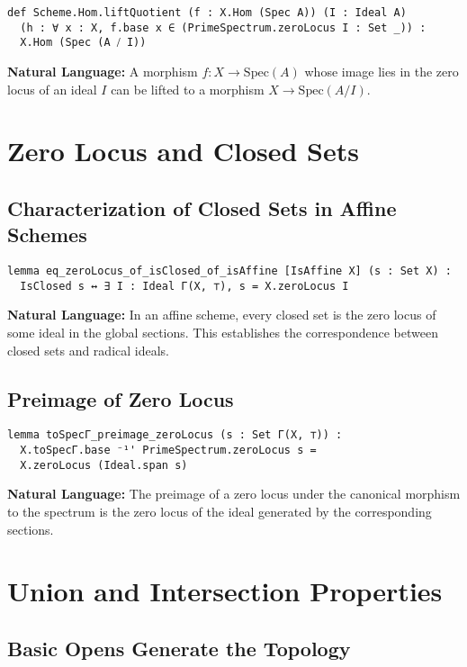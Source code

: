\documentclass{article}
\theoremstyle{definition}
\begin{document}
\begin{lstlisting}
def Scheme.Hom.liftQuotient (f : X.Hom (Spec A)) (I : Ideal A)
  (h : ∀ x : X, f.base x ∈ (PrimeSpectrum.zeroLocus I : Set _)) :
  X.Hom (Spec (A ⧸ I))
\end{lstlisting}

\textbf{Natural Language:} A morphism $f: X \to \mathrm{Spec}(A)$ whose image lies in the zero locus of an ideal $I$ can be lifted to a morphism $X \to \mathrm{Spec}(A/I)$.

\section{Zero Locus and Closed Sets}

\subsection{Characterization of Closed Sets in Affine Schemes}

\begin{lstlisting}
lemma eq_zeroLocus_of_isClosed_of_isAffine [IsAffine X] (s : Set X) :
  IsClosed s ↔ ∃ I : Ideal Γ(X, ⊤), s = X.zeroLocus I
\end{lstlisting}

\textbf{Natural Language:} In an affine scheme, every closed set is the zero locus of some ideal in the global sections. This establishes the correspondence between closed sets and radical ideals.

\subsection{Preimage of Zero Locus}

\begin{lstlisting}
lemma toSpecΓ_preimage_zeroLocus (s : Set Γ(X, ⊤)) :
  X.toSpecΓ.base ⁻¹' PrimeSpectrum.zeroLocus s =
  X.zeroLocus (Ideal.span s)
\end{lstlisting}

\textbf{Natural Language:} The preimage of a zero locus under the canonical morphism to the spectrum is the zero locus of the ideal generated by the corresponding sections.

\section{Union and Intersection Properties}

\subsection{Basic Opens Generate the Topology}
\end{document}
